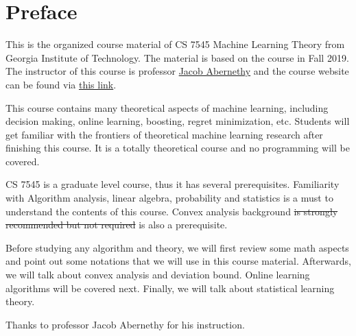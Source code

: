 \documentclass[../main.tex]{subfiles}
\begin{document}
\chapter*{Preface}

This is the organized course material of CS 7545 Machine Learning Theory from Georgia Institute of Technology. The material is based on the course in Fall 2019. The instructor of this course is professor \href{https://www.cc.gatech.edu/~jabernethy9/}{Jacob Abernethy} and the course website can be found via \href{https://mltheory.github.io/CS7545/}{this link}.

This course contains many theoretical aspects of machine learning, including decision making, online learning, boosting, regret minimization, etc. Students will get familiar with the frontiers of theoretical machine learning research after finishing this course. It is a totally theoretical course and no programming will be covered.

CS 7545 is a graduate level course, thus it has several prerequisites. Familiarity with Algorithm analysis, linear algebra, probability and statistics is a must to understand the contents of this course. Convex analysis background \sout{is strongly recommended but not required} is also a prerequisite.

Before studying any algorithm and theory, we will first review some math aspects and point out some notations that we will use in this course material. Afterwards, we will talk about convex analysis and deviation bound. Online learning algorithms will be covered next. Finally, we will talk about statistical learning theory. 

Thanks to professor Jacob Abernethy for his instruction.
\end{document}
